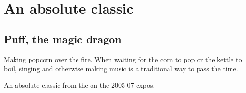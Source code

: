 \section{An absolute classic}
\subsection{Puff, the magic dragon}

\begin{marginfigure}
      \checkoddpage \ifoddpage \forcerectofloat \else \forceversofloat \fi
      \centering
  \caption{Making popcorn over the fire. When waiting for the corn to pop or the kettle to boil, singing and otherwise making music is a traditional way to pass the time. }
\end{marginfigure}

An absolute classic from the  on the 2005-07 expos.

